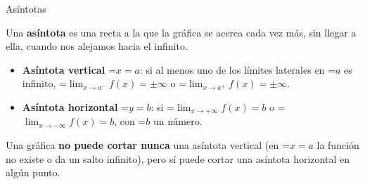 \documentclass[11pt,a4paper]{article}
\newcommand{\fmm}[1]{\setbox0=\hbox{$#1$}\ifdim\wd0>\linewidth\[#1\]\else\mbox{\box0}\fi}
\begin{document}
  

  
\begin{fmdef}{Asíntotas}
\par\noindent \begin{minipage}[t]{0.48\linewidth}\vspace{0pt}\raggedright Una \textbf{asíntota} es una recta a la que la gráfica se acerca cada vez más, sin llegar a ella, cuando nos alejamos hacia el infinito.

          
\begin{itemize}
\item \textbf{Asíntota vertical} \fmm{x=a}: si al menos uno de los límites laterales en \fmm{a} es infinito, \fmm{\displaystyle\lim_{x\to a^-}f(x)=\pm\infty} o \fmm{\displaystyle\lim_{x\to a^+}f(x)=\pm\infty}.
\item \textbf{Asíntota horizontal} \fmm{y=b}: si \fmm{\displaystyle\lim_{x\to+\infty}f(x)=b} o \fmm{\displaystyle\lim_{x\to-\infty}f(x)=b}, con \fmm{b} un número.
\end{itemize}\end{minipage}\hfill\begin{minipage}[t]{0.48\linewidth}\vspace{0pt}\raggedright \begin{center}\end{center}\end{minipage}\par\medskip

      
\begin{fmnote}Una gráfica \textbf{no puede cortar nunca} una asíntota vertical (en \fmm{x=a} la función no existe o da un salto infinito), pero sí puede cortar una asíntota horizontal en algún punto.\end{fmnote}
\end{fmdef}
\end{document}

